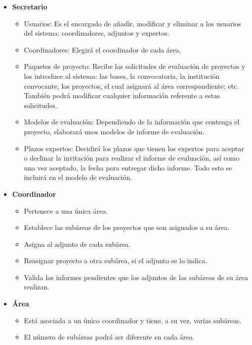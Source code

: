 \documentclass[12pt,a4paper,spanish,twoside]{article}
\begin{document}
\begin{itemize}
\item \textbf{Secretario}
\begin{itemize}
\item Usuarios: Es el encargado de añadir, modificar y eliminar a los usuarios del sistema: 
coordinadores, adjuntos 
y expertos.
\item Coordinadores: Elegirá el coordinador de cada área.
\item Paquetes de proyecto: Recibe las solicitudes de evaluación de proyectos y los introduce 
al sistema: las bases, la convocatoria, la institución convocante, los proyectos, el cual asignará 
al área correspondiente; etc. También podrá modificar cualquier información referente a estas solicitudes. 
\item Modelos de evaluación: Dependiendo de la información que contenga el proyecto, elaborará unos 
modelos de informe de evaluación.
\item Plazos expertos: Decidirá los plazos que tienen los expertos para aceptar o declinar la invitación 
para realizar el informe de evaluación, así como una vez aceptado, la fecha para entregar dicho informe. 
Todo esto se incluirá en el modelo de evaluación.
\end{itemize}

\item \textbf{Coordinador}
\begin{itemize}
\item Pertenece a una única área.
\item Establece las subáreas de los proyectos que son asignados a su área.
\item Asigna al adjunto de cada subárea.
\item Reasignar proyecto a otra subárea, si el adjunto se lo indica.
\item Valida los informes pendientes que los adjuntos de las subáreas de su área realizan.
\end{itemize}

\item \textbf{Área}
\begin{itemize}
\item Está asociada a un único coordinador y tiene, a su vez, varias subáreas. 
\item El número de subáreas podrá ser diferente en cada área.
\end{itemize}


\end{itemize}
\end{document}
